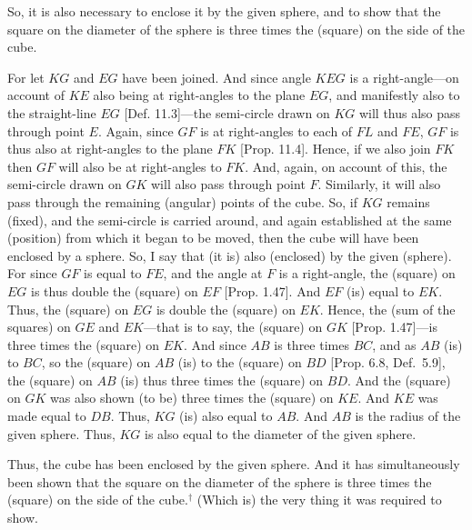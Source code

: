 \begin{Parallel}{}{}
{So, it is also necessary
to enclose it by the given sphere, and to show that the square on
the diameter of the sphere is three times the (square) on the side of the cube.

\centerline{}

For let $KG$ and $EG$ have been joined. And since
angle $KEG$ is a right-angle---on account of $KE$ also being at right-angles
to the plane $EG$, and manifestly also to the straight-line $EG$ [Def. 11.3]---the semi-circle drawn on $KG$ will thus also pass through
point $E$. Again, since $GF$ is at right-angles to each of $FL$
and $FE$, $GF$ is thus also at right-angles to the plane $FK$ [Prop. 11.4]. 
Hence, if we also join $FK$ then $GF$ will also be at right-angles to
$FK$. And, again, on account of this, the semi-circle drawn on
$GK$ will also pass through point $F$. Similarly, it will also pass through
the remaining (angular) points of the cube. So, if $KG$ remains (fixed), 
and the semi-circle is carried around, and again established at the
same (position) from which it began to be moved, then the cube will
have been enclosed by a sphere. So, I say that (it is) also (enclosed)
by the given (sphere). For since $GF$ is equal to $FE$, and the
angle at $F$ is a right-angle, the (square) on $EG$ is thus double
the (square) on $EF$ [Prop. 1.47]. And $EF$ (is) equal to
$EK$. Thus, the (square) on $EG$ is double the (square) on $EK$.
Hence, the (sum of the squares) on $GE$ and $EK$---that is to say, the
(square) on $GK$ [Prop. 1.47]---is three times the  (square) on $EK$. And since
$AB$ is three times $BC$, and as $AB$ (is) to $BC$, so the
(square) on $AB$ (is) to the (square) on $BD$ [Prop. 6.8, Def.~5.9], 
the (square) on $AB$ (is) thus three times the (square) on $BD$. 
And the (square) on $GK$ was also shown (to be) three times
the (square) on $KE$. And $KE$ was made equal to $DB$. 
Thus, $KG$ (is) also equal to $AB$. And $AB$ is the
radius of the given sphere. Thus, $KG$ is also equal to the diameter of the
given sphere.

Thus, the cube has been enclosed by the given sphere. And it
has simultaneously been shown that the square on the diameter of
the sphere is three times the (square) on the side of the cube.$^\dag$ (Which is)
the very thing it was required to show.}
\end{Parallel}



